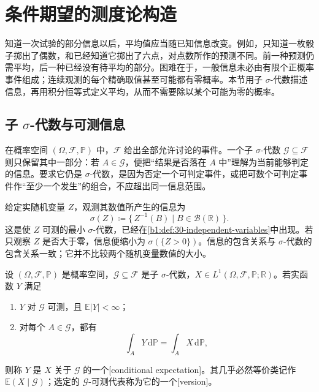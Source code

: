 \section{条件期望的测度论构造}
\label{b1:sec:3101}

知道一次试验的部分信息以后，平均值应当随已知信息改变。例如，只知道一枚骰子掷出了偶数，和已经知道它掷出了六点，对点数所作的预测不同。前一种预测仍需平均，后一种已经没有待平均的部分。困难在于，一般信息未必由有限个正概率事件组成；连续观测的每个精确取值甚至可能都有零概率。本节用子 \(\sigma\)-代数描述信息，再用积分恒等式定义平均，从而不需要除以某个可能为零的概率。

\subsection{子 \texorpdfstring{\(\sigma\)}{sigma}-代数与可测信息}
\label{b1:subsec:310101}

在概率空间 \((\Omega,\mathcal F,\mathbb P)\) 中，\(\mathcal F\) 给出全部允许讨论的事件。一个子 \(\sigma\)-代数 \(\mathcal G\subseteq\mathcal F\) 则只保留其中一部分：若 \(A\in\mathcal G\)，便把“结果是否落在 \(A\) 中”理解为当前能够判定的信息。要求它仍是 \(\sigma\)-代数，是因为否定一个可判定事件，或把可数个可判定事件作“至少一个发生”的组合，不应超出同一信息范围。

\ProseParagraphBreak

给定实随机变量 \(Z\)，观测其数值所产生的信息为
\[
 \sigma(Z)\coloneqq\{\,Z^{-1}(B)\mid B\in\mathcal B(\mathbb R)\,\}.
\]
这是使 \(Z\) 可测的最小 \(\sigma\)-代数，已经在\cref{b1:def:30-independent-variables}中出现。若只观察 \(Z\) 是否大于零，信息便缩小为 \(\sigma(\{Z>0\})\)。信息的包含关系与 \(\sigma\)-代数的包含关系一致；它并不比较两个随机变量数值的大小。

\begin{definition}\label{b1:def:conditional-expectation-31}
设 \((\Omega,\mathcal F,\mathbb P)\) 是概率空间，\(\mathcal G\subseteq\mathcal F\) 是子 \(\sigma\)-代数，\(X\in L^1(\Omega,\mathcal F,\mathbb P;\mathbb R)\)。若实函数 \(Y\) 满足
\begin{enumerate}
 \item\label{b1:item:ce-measurable-31}\(Y\) 对 \(\mathcal G\) 可测，且 \(\mathbb E|Y|<\infty\)；
 \item\label{b1:item:ce-integral-31}对每个 \(A\in\mathcal G\)，都有
 \begin{equation}\label{b1:eq:conditional-expectation-test-31}
  \int_A Y\,\mathrm d\mathbb P=\int_A X\,\mathrm d\mathbb P,
 \end{equation}
\end{enumerate}
则称 \(Y\) 是 \(X\) 关于 \(\mathcal G\) 的一个[conditional expectation]。其几乎必然等价类记作 \(\mathbb E(X\mid\mathcal G)\)；选定的 \(\mathcal G\)-可测代表称为它的一个[version]。
\end{definition}

